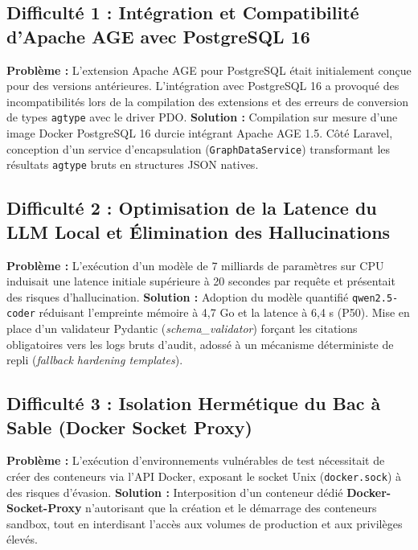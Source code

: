 \subsection{Difficult\'e 1 : Int\'egration et Compatibilit\'e d'Apache AGE avec PostgreSQL 16}
\par \textbf{Probl\`eme :} L'extension Apache AGE pour PostgreSQL \'etait initialement con\c{c}ue pour des versions ant\'erieures. L'int\'egration avec PostgreSQL 16 a provoqu\'e des incompatibilit\'es lors de la compilation des extensions et des erreurs de conversion de types \texttt{agtype} avec le driver PDO. \newline
\textbf{Solution :} Compilation sur mesure d'une image Docker PostgreSQL 16 durcie int\'egrant Apache AGE 1.5. C\^ot\'e Laravel, conception d'un service d'encapsulation (\texttt{GraphDataService}) transformant les r\'esultats \texttt{agtype} bruts en structures JSON natives.

\subsection{Difficult\'e 2 : Optimisation de la Latence du LLM Local et \'Elimination des Hallucinations}
\par \textbf{Probl\`eme :} L'ex\'ecution d'un mod\`ele de 7 milliards de param\`etres sur CPU induisait une latence initiale sup\'erieure \`a 20 secondes par requ\^ete et pr\'esentait des risques d'hallucination. \newline
\textbf{Solution :} Adoption du mod\`ele quantifi\'e \texttt{qwen2.5-coder} r\'eduisant l'empreinte m\'emoire \`a 4,7 Go et la latence \`a 6,4 s (P50). Mise en place d'un validateur Pydantic (\textit{schema\_validator}) for\c{c}ant les citations obligatoires vers les logs bruts d'audit, adoss\'e \`a un m\'ecanisme d\'eterministe de repli (\textit{fallback hardening templates}).

\subsection{Difficult\'e 3 : Isolation Herm\'etique du Bac \`a Sable (Docker Socket Proxy)}
\par \textbf{Probl\`eme :} L'ex\'ecution d'environnements vuln\'erables de test n\'ecessitait de cr\'eer des conteneurs via l'API Docker, exposant le socket Unix (\texttt{docker.sock}) \`a des risques d'\'evasion. \newline
\textbf{Solution :} Interposition d'un conteneur d\'edi\'e \textbf{Docker-Socket-Proxy} n'autorisant que la cr\'eation et le d\'emarrage des conteneurs sandbox, tout en interdisant l'acc\`es aux volumes de production et aux privil\`eges \'elev\'es.

